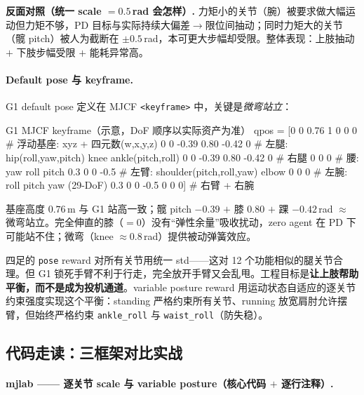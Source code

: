 \begin{note}
\textbf{反面对照（统一 scale $=0.5$\,rad 会怎样）.}\;
力矩小的关节（腕）被要求做大幅运动但力矩不够，PD 目标与实际持续大偏差$\to$限位间抽动；同时力矩大的关节（髋 pitch）被人为截断在 $\pm0.5$\,rad，本可更大步幅却受限。整体表现：上肢抽动 $+$ 下肢步幅受限 $+$ 能耗异常高。
\end{note}

\paragraph{Default pose 与 keyframe.}
G1 default pose 定义在 MJCF \texttt{<keyframe>} 中，关键是\emph{微弯站立}：

\begin{codebox}[text]{G1 MJCF keyframe（示意，DoF 顺序以实际资产为准）}
qpos = [0 0 0.76  1 0 0 0          # 浮动基座: xyz + 四元数(w,x,y,z)
        0 0 -0.39 0.80 -0.42 0     # 左腿: hip(roll,yaw,pitch) knee ankle(pitch,roll)
        0 0 -0.39 0.80 -0.42 0     # 右腿
        0 0 0                      # 腰: yaw roll pitch
        0.3 0 0 -0.5               # 左臂: shoulder(pitch,roll,yaw) elbow
        0 0 0                      # 左腕: roll pitch yaw (29-DoF)
        0.3 0 0 -0.5  0 0 0]       # 右臂 + 右腕
\end{codebox}

基座高度 $0.76$\,m 与 G1 站高一致；髋 pitch $-0.39$ $+$ 膝 $0.80$ $+$ 踝 $-0.42$\,rad $\approx$ 微弯站立。完全伸直的膝（$=0$）没有“弹性余量”吸收扰动，zero agent 在 PD 下可能站不住；微弯（knee $\approx 0.8$\,rad）提供被动弹簧效应。

\begin{insight}[完全锁死与完全放松都不是好配置]\label{ins:rlmc-hl-vp}
四足的 \texttt{pose} reward 对所有关节用统一 std——这对 12 个功能相似的腿关节合理。但 G1 锁死手臂不利于行走，完全放开手臂又会乱甩。工程目标是\textbf{让上肢帮助平衡，而不是成为投机通道}。variable posture reward 用运动状态自适应的逐关节约束强度实现这个平衡：standing 严格约束所有关节、running 放宽肩肘允许摆臂，但始终严格约束 \texttt{ankle\_roll} 与 \texttt{waist\_roll}（防失稳）。
\end{insight}

\subsection{代码走读：三框架对比实战}

\paragraph{mjlab —— 逐关节 scale 与 variable posture（核心代码 $+$ 逐行注释）.}

